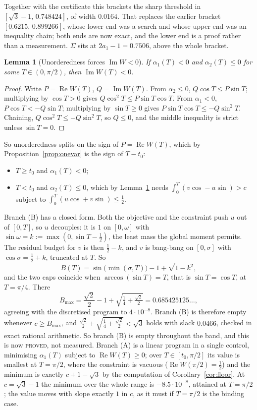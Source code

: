 \documentclass[11pt]{article}
\newtheorem{lemma}[theorem]{Lemma}
\theoremstyle{definition}
\newcommand{\Sig}{\Sigma}
\begin{document}
Together with the certificate this brackets the sharp threshold in
$[\sqrt3-1,\,0.748424]$, of width $0.0164$. That replaces the earlier bracket
$[0.6215,\,0.899266]$, whose lower end was a search and whose upper end was an inequality
chain; both ends are now exact, and the lower end is a proof rather than a measurement.
$\Sig$ sits at $2a_1-1=0.7506$, above the whole bracket.

\begin{lemma}[Unorderedness forces $\operatorname{Im}W<0$]\label{lem:imw}
If $\alpha_1(T)<0$ and $\alpha_2(T)\le0$ for some $T\in(0,\pi/2)$, then
$\operatorname{Im}W(T)<0$.
\end{lemma}

\begin{proof}
Write $P=\operatorname{Re}W(T)$, $Q=\operatorname{Im}W(T)$. From $\alpha_2\le0$,
$Q\cos T\le P\sin T$; multiplying by $\cos T>0$ gives $Q\cos^2T\le P\sin T\cos T$. From
$\alpha_1<0$, $P\cos T<-Q\sin T$; multiplying by $\sin T\ge0$ gives
$P\sin T\cos T\le-Q\sin^2T$. Chaining, $Q\cos^2T\le-Q\sin^2T$, so $Q\le0$, and the middle
inequality is strict unless $\sin T=0$.
\end{proof}

So unorderedness splits on the sign of $P=\operatorname{Re}W(T)$, which by
Proposition~\ref{prop:onevar} is the sign of $T-t_0$:
\begin{itemize}
\item[(A)] $T\ge t_0$ and $\alpha_1(T)<0$;
\item[(B)] $T<t_0$ and $\alpha_2(T)\le0$, which by Lemma~\ref{lem:imw} needs
$\int_0^T(v\cos-u\sin)>c$ subject to $\int_0^T(u\cos+v\sin)\le\tfrac12$.
\end{itemize}
Branch (B) has a closed form. Both the objective and the constraint push $u$ out of
$[0,T]$, so $u$ decouples: it is $1$ on $[0,\omega]$ with $\sin\omega=k:=\max(0,\sin T
-\tfrac12)$, the least mass the global moment permits. The residual budget for $v$ is then
$\tfrac12-k$, and $v$ is bang-bang on $[0,\sigma]$ with $\cos\sigma=\tfrac12+k$, truncated
at $T$. So
\[
  B(T)=\sin\bigl(\min(\sigma,T)\bigr)-1+\sqrt{1-k^2} ,
\]
and the two caps coincide when $\arccos(\sin T)=T$, that is $\sin T=\cos T$, at
$T=\pi/4$. There
\[
  B_{\max}=\frac{\sqrt2}2-1+\sqrt{\tfrac14+\tfrac{\sqrt2}2}=0.685425125\ldots ,
\]
agreeing with the discretised program to $4\cdot10^{-8}$. Branch (B) is therefore empty
whenever $c\ge B_{\max}$, and
$\tfrac{\sqrt2}2+\sqrt{\tfrac14+\tfrac{\sqrt2}2}<\sqrt3$ holds with slack $0.0466$, checked
in exact rational arithmetic. So branch (B) is empty throughout the band, and this is now
\textsc{proved}, not measured. Branch (A) is a linear program in a
single control, minimising $\alpha_1(T)$ subject to $\operatorname{Re}W(T)\ge0$; over
$T\in[t_0,\pi/2]$ its value is smallest at $T=\pi/2$, where the constraint is vacuous
($\operatorname{Re}W(\pi/2)=\tfrac12$) and the minimum is exactly $c+1-\sqrt3$ by the
computation of Corollary~\ref{cor:floor}. At $c=\sqrt3-1$ the minimum over the whole range
is $-8.5\cdot10^{-8}$, attained at $T=\pi/2$; the value moves with slope exactly $1$ in
$c$, as it must if $T=\pi/2$ is the binding case.
\end{document}
